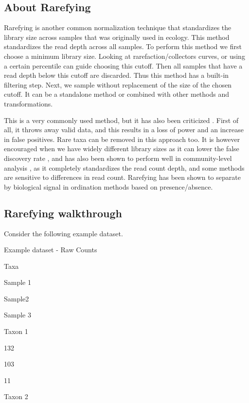 \documentclass[
]{book}
\begin{document}
\hypertarget{about-rarefying}{%
\subsection{About Rarefying}\label{about-rarefying}}

Rarefying is another common normalization technique that standardizes the library size across samples that was originally used in ecology. This method standardizes the read depth across all samples. To perform this method we first choose a minimum library size. Looking at rarefaction/collectors curves, or using a certain percentile can guide choosing this cutoff. Then all samples that have a read depth below this cutoff are discarded. Thus this method has a built-in filtering step. Next, we sample without replacement of the size of the chosen cutoff. It can be a standalone method or combined with other methods and transformations.

This is a very commonly used method, but it has also been criticized \citep{mcmurdie2014}. First of all, it throws away valid data, and this results in a loss of power and an increase in false positives. Rare taxa can be removed in this approach too. It is however encouraged when we have widely different library sizes as it can lower the false discovery rate \citep{weiss2017}, and has also been shown to perform well in community-level analysis \citep{mcknight2019}, as it completely standardizes the read count depth, and some methods are sensitive to differences in read count. Rarefying has been shown to separate by biological signal in ordination methods based on presence/absence.

\hypertarget{rarefying-walkthrough}{%
\subsection{Rarefying walkthrough}\label{rarefying-walkthrough}}

Consider the following example dataset.

\label{tab:unnamed-chunk-15}Example dataset - Raw Counts

Taxa

Sample 1

Sample2

Sample 3

Taxon 1

132

103

11

Taxon 2
\end{document}
